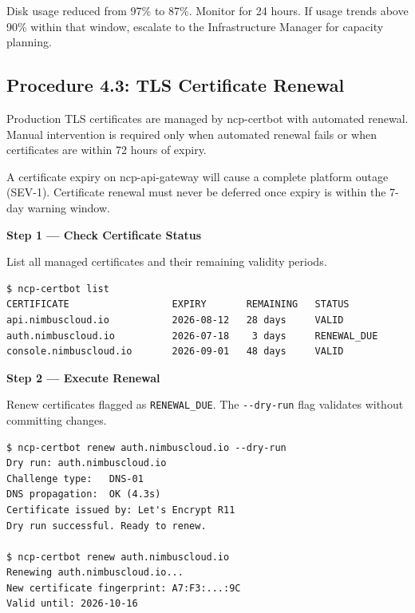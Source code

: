 \begin{successbox}
Disk usage reduced from 97\% to 87\%. Monitor for 24 hours. If usage trends above 90\% within that window, escalate to the Infrastructure Manager for capacity planning.
\end{successbox}

\subsection{Procedure 4.3: TLS Certificate Renewal}

Production TLS certificates are managed by ncp-certbot with automated renewal. Manual intervention is required only when automated renewal fails or when certificates are within 72 hours of expiry.

\begin{warningbox}
A certificate expiry on ncp-api-gateway will cause a complete platform outage (SEV-1). Certificate renewal must never be deferred once expiry is within the 7-day warning window.
\end{warningbox}

\begin{stepbox}
\textbf{Step 1 --- Check Certificate Status}\smallskip

List all managed certificates and their remaining validity periods.
\end{stepbox}

\begin{cmdbox}
\begin{Verbatim}[fontsize=\footnotesize]
$ ncp-certbot list
CERTIFICATE                  EXPIRY       REMAINING   STATUS
api.nimbuscloud.io           2026-08-12   28 days     VALID
auth.nimbuscloud.io          2026-07-18    3 days     RENEWAL_DUE
console.nimbuscloud.io       2026-09-01   48 days     VALID
\end{Verbatim}
\end{cmdbox}

\begin{stepbox}
\textbf{Step 2 --- Execute Renewal}\smallskip

Renew certificates flagged as \texttt{RENEWAL\_DUE}. The \texttt{-{}-dry-run} flag validates without committing changes.
\end{stepbox}

\begin{cmdbox}
\begin{Verbatim}[fontsize=\footnotesize]
$ ncp-certbot renew auth.nimbuscloud.io --dry-run
Dry run: auth.nimbuscloud.io
Challenge type:   DNS-01
DNS propagation:  OK (4.3s)
Certificate issued by: Let's Encrypt R11
Dry run successful. Ready to renew.

$ ncp-certbot renew auth.nimbuscloud.io
Renewing auth.nimbuscloud.io...
New certificate fingerprint: A7:F3:...:9C
Valid until: 2026-10-16
\end{Verbatim}
\end{cmdbox}

